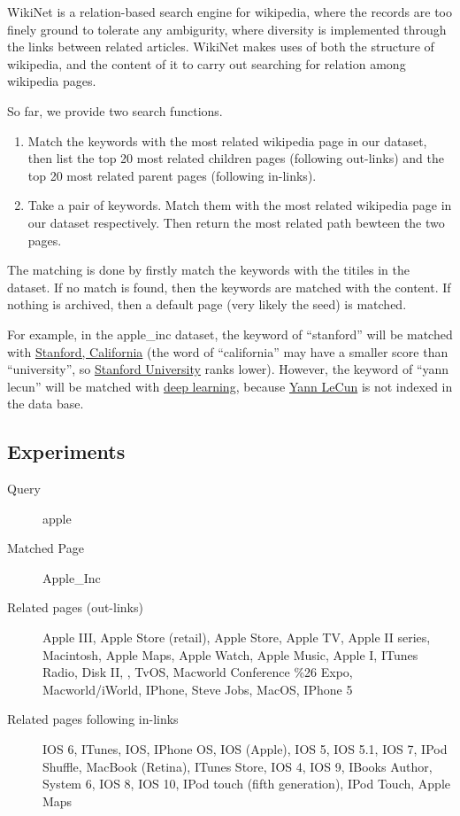 \documentclass[12pt]{amsart}
\newcommand{\0}{\mat{0}}
\newcommand{\1}{\mathds{1}}
\begin{document}
WikiNet is a relation-based search engine for wikipedia, where the records are too finely ground to tolerate any ambigurity, where diversity is implemented through the links between related articles. 
WikiNet makes uses of both the structure of wikipedia, and the content of it to carry out searching for relation among wikipedia pages. 

So far, we provide two search functions. 
\begin{enumerate}[label=\arabic*.]
\item Match the keywords with the most related wikipedia page in our dataset, then list the top 20 most related children pages (following out-links) and the top 20 most related parent pages (following in-links).
\item Take a pair of keywords. Match them with the most related wikipedia page in our dataset respectively. Then return the most related path bewteen the two pages. 
\end{enumerate}
The matching is done by firstly match the keywords with the titiles in the dataset. If no match is found, then the keywords are matched with the content. If nothing is archived, then a default page (very likely the seed) is matched. 

For example, in the apple\_inc dataset, the keyword of ``stanford'' will be matched with \href{https://en.wikipedia.org/wiki/Stanford,\_California}{Stanford, California} (the word of ``california'' may have a smaller score than ``university'', so \href{https://en.wikipedia.org/wiki/Stanford\_University}{Stanford University} ranks lower). However, the keyword of ``yann lecun'' will be matched with \href{https://en.wikipedia.org/wiki/Deep\_learning}{deep learning}, because \href{https://en.wikipedia.org/wiki/Yann\_LeCun}{Yann LeCun} is not indexed in the data base. 

\subsection{Experiments}
\begin{description}
\item[Query] apple
\item[Matched Page] Apple\_Inc
\item[Related pages (out-links)] Apple III, Apple Store (retail), Apple Store, Apple TV, Apple II series, Macintosh, Apple Maps, Apple Watch, Apple Music, Apple I, ITunes Radio, Disk II, {\color{red}{Apple Inc.}}, TvOS, Macworld Conference \%26 Expo, Macworld/iWorld, IPhone, Steve Jobs, MacOS, IPhone 5 
\item[Related pages following in-links] IOS 6, ITunes, IOS, IPhone OS, IOS (Apple), IOS 5, IOS 5.1, IOS 7, IPod Shuffle, MacBook (Retina), ITunes Store, IOS 4, IOS 9, IBooks Author, System 6, IOS 8, IOS 10, IPod touch (fifth generation), IPod Touch, Apple Maps
\end{description}
\end{document}
